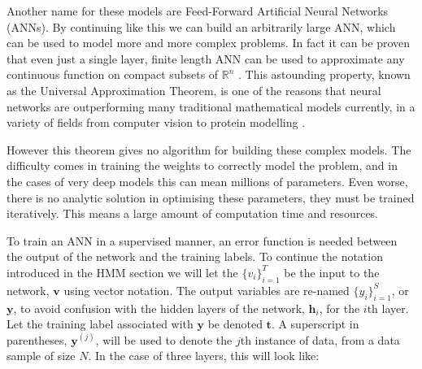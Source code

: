 \documentclass[bsc,singlespacing,logo, parskip, deptreport]{infthesis}
\begin{document}
Another name for these models are Feed-Forward Artificial Neural Networks (ANNs). By continuing like this we can build an arbitrarily large ANN, which can be used to model more and more complex problems. In fact it can be proven that even just a single layer, finite length ANN can be used to approximate any continuous function on compact subsets of ${\mathbb R}^n$ \cite{cybenko1989approximation}\cite{hornik1989multilayer}. This astounding property, known as the Universal Approximation Theorem, is one of the reasons that neural networks are outperforming many traditional mathematical models currently, in a variety of fields from computer vision \cite{krizhevsky2012imagenet} to protein modelling \cite{uziela2017proq3d}.

However this theorem gives no algorithm for building these complex models. The difficulty comes in training the weights to correctly model the problem, and in the cases of very deep models this can mean millions of parameters. Even worse, there is no analytic solution in optimising these parameters, they must be trained iteratively. This means a large amount of computation time and resources.

To train an ANN in a supervised manner, an error function is needed between the output of the network and the training labels. To continue the notation introduced in the HMM section we will let the $\{v_i\}_{i=1}^{T}$ be the input to the network, $\bm{v}$ using vector notation. The output variables are re-named $\{y_i\}_{i=1}^{S}$, or $\bm{y}$, to avoid confusion with the hidden layers of the network, $\bm{h}_i$, for the $i$th layer. Let the training label associated with $\bm{y}$ be denoted $\bm{t}$. A superscript in parentheses, $\bm{y}^{(j)}$, will be used to denote the $j$th instance of data, from a data sample of size $N$. In the case of three layers, this will look like:

\begin{center}
\end{center}
\end{document}
